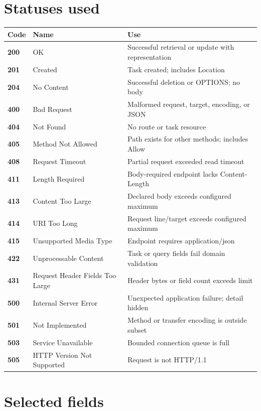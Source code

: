 \section{Statuses used}

\begin{longtable}{@{}>{\bfseries}p{18mm}p{40mm}p{90mm}@{}}
\toprule
Code & Name & Use \\
\midrule
\endhead
200 & OK & Successful retrieval or update with representation \\
201 & Created & Task created; includes Location \\
204 & No Content & Successful deletion or OPTIONS; no body \\
400 & Bad Request & Malformed request, target, encoding, or JSON \\
404 & Not Found & No route or task resource \\
405 & Method Not Allowed & Path exists for other methods; includes Allow \\
408 & Request Timeout & Partial request exceeded read timeout \\
411 & Length Required & Body-required endpoint lacks Content-Length \\
413 & Content Too Large & Declared body exceeds configured maximum \\
414 & URI Too Long & Request line/target exceeds configured maximum \\
415 & Unsupported Media Type & Endpoint requires application/json \\
422 & Unprocessable Content & Task or query fields fail domain validation \\
431 & Request Header Fields Too Large & Header bytes or field count exceeds limit \\
500 & Internal Server Error & Unexpected application failure; detail hidden \\
501 & Not Implemented & Method or transfer encoding is outside subset \\
503 & Service Unavailable & Bounded connection queue is full \\
505 & HTTP Version Not Supported & Request is not HTTP/1.1 \\
\bottomrule
\end{longtable}

\section{Selected fields}

